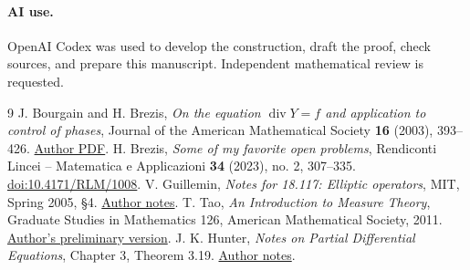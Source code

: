 \documentclass[11pt]{article}
\DeclareMathOperator{\diver}{div}
\begin{document}
\paragraph{AI use.}
OpenAI Codex was used to develop the construction, draft the proof, check
sources, and prepare this manuscript. Independent mathematical review is
requested.

\begin{thebibliography}{9}
J. Bourgain and H. Brezis,
\emph{On the equation $\diver Y=f$ and application to control of phases},
Journal of the American Mathematical Society \textbf{16} (2003), 393--426.
\href{https://sites.math.rutgers.edu/~brezis/PUBlications/171-J.pdf}{Author PDF}.
H. Brezis, \emph{Some of my favorite open problems},
Rendiconti Lincei -- Matematica e Applicazioni \textbf{34} (2023),
no. 2, 307--335.
\href{https://doi.org/10.4171/RLM/1008}{doi:10.4171/RLM/1008}.
V. Guillemin, \emph{Notes for 18.117: Elliptic operators}, MIT, Spring 2005,
\S4. \href{https://math.mit.edu/~vwg/classnotes-spring05.pdf}{Author notes}.
T. Tao, \emph{An Introduction to Measure Theory}, Graduate Studies in
Mathematics 126, American Mathematical Society, 2011.
\href{https://terrytao.wordpress.com/wp-content/uploads/2012/12/gsm-126-tao5-measure-book.pdf}{Author's preliminary version}.
J. K. Hunter, \emph{Notes on Partial Differential Equations}, Chapter 3,
Theorem 3.19. \href{https://www.math.ucdavis.edu/~hunter/pdes/ch3.pdf}{Author notes}.
\end{thebibliography}
\end{document}
